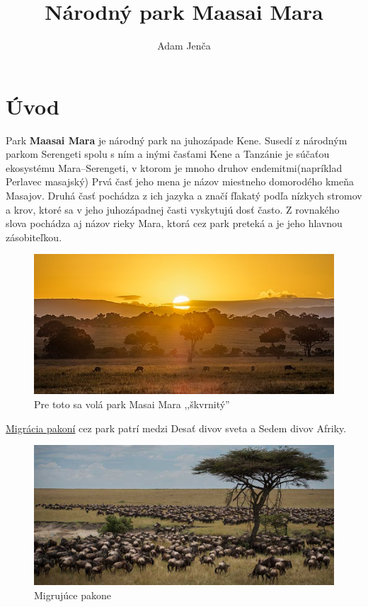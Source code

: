 \documentclass{article}
\title{Národný park Maasai Mara}
\author{Adam Jenča}
\begin{document}
\pagecolor{white}
\color{sedocierna}
\maketitle
{{\tableofcontents{}}}
\newpage
\section{Úvod}
Park \textbf{Maasai Mara} je národný park na juhozápade Kene. Susedí z národným parkom Serengeti spolu s ním a inými časťami Kene a Tanzánie je súčaťou ekosystému Mara--Serengeti, v ktorom je mnoho druhov endemitmi(napríklad Perlavec masajský) Prvá časť jeho mena je názov miestneho domorodého kmeňa Masajov. Druhá časť pochádza z ich jazyka a značí fľakatý podľa nízkych stromov a krov, ktoré sa v jeho juhozápadnej časti vyskytujú dosť často. Z rovnakého slova pochádza aj názov rieky Mara, ktorá cez park preteká a je jeho hlavnou zásobiteľkou.

\begin{figure}[h]
\centering
\includegraphics[scale=0.65]{mara-skvrnity.jpg} \caption{Pre toto sa volá park Masai Mara ,,škvrnitý''}
\end{figure}

\noindent
 \hyperref[sec:gmwildebe]{Migrácia pakoní} cez park patrí medzi Desať divov sveta a Sedem divov Afriky.
\vskip 5mm
%

\begin{figure}[h]
\centering
\includegraphics[scale=0.35]{migracia-velka.jpg} \caption{Migrujúce pakone}
\end{figure}
\end{document}

